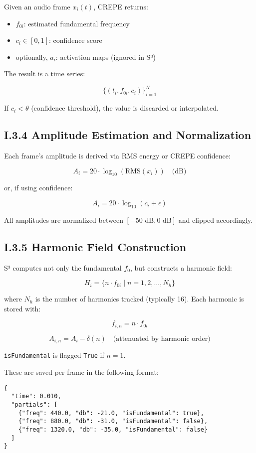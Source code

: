 Given an audio frame $x_i(t)$, CREPE returns:

\begin{itemize}
    \item $f_{0i}$: estimated fundamental frequency
    \item $c_i \in [0,1]$: confidence score
    \item optionally, $a_i$: activation maps (ignored in S³)
\end{itemize}

The result is a time series:

\[
\{ (t_i, f_{0i}, c_i) \}_{i=1}^N
\]

If $c_i < \theta$ (confidence threshold), the value is discarded or interpolated.

\subsection*{I.3.4 Amplitude Estimation and Normalization}

Each frame’s amplitude is derived via RMS energy or CREPE confidence:

\[
A_i = 20 \cdot \log_{10}(\text{RMS}(x_i)) \quad \text{(dB)}
\]

or, if using confidence:

\[
A_i = 20 \cdot \log_{10}(c_i + \epsilon)
\]

All amplitudes are normalized between $[-50 \text{ dB}, 0 \text{ dB}]$ and clipped accordingly.

\subsection*{I.3.5 Harmonic Field Construction}

S³ computes not only the fundamental $f_0$, but constructs a harmonic field:

\[
H_i = \{ n \cdot f_{0i} \mid n = 1, 2, \ldots, N_h \}
\]

where $N_h$ is the number of harmonics tracked (typically 16). Each harmonic is stored with:

\[
f_{i,n} = n \cdot f_{0i}
\]

\[
A_{i,n} = A_i - \delta(n) \quad \text{(attenuated by harmonic order)}
\]

\texttt{isFundamental} is flagged \texttt{True} if $n = 1$.

These are saved per frame in the following format:

\begin{verbatim}
{
  "time": 0.010,
  "partials": [
    {"freq": 440.0, "db": -21.0, "isFundamental": true},
    {"freq": 880.0, "db": -31.0, "isFundamental": false},
    {"freq": 1320.0, "db": -35.0, "isFundamental": false}
  ]
}
\end{verbatim}

